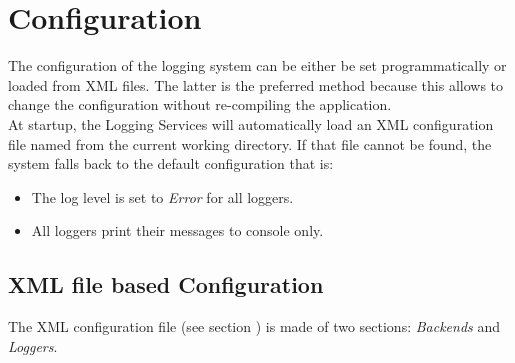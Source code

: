 \newpage



\section{Configuration} \label{sec:configuration}

The configuration of the logging system can be either be set programmatically or loaded from XML files. The latter is the preferred method because this allows to change the configuration without re-compiling the application.\\
At startup, the Logging Services will automatically load an XML configuration file named  from the current working directory. If that file cannot be found, the system falls back to the default configuration that is:
\begin{itemize}
	\item The log level is set to \textit{Error} for all loggers.
	\item All loggers print their messages to console only.
\end{itemize}

\subsection{XML file based Configuration}
The XML configuration file (see section ) is made of two sections: \textit{Backends} and \textit{Loggers}.

